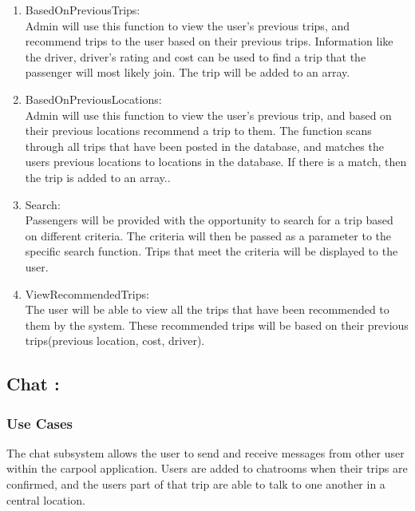 \documentclass[hidelinks, 12pt, a4paper]{article}
\begin{document}
\begin{enumerate}[label=U1.\arabic*]
                \item BasedOnPreviousTrips:\\
                Admin will use this function to view the user’s previous trips, and recommend trips to the user based on their previous trips. Information like the driver, driver’s rating and cost can be used to find a trip that the passenger will most likely join. The trip will be added to an array.\\
                	
                \item BasedOnPreviousLocations: \\
                Admin will use this function to view the user’s previous trip, and based on their previous locations recommend a trip to them. The function scans through all trips that have been posted in the database, and matches the users  previous locations to locations in the database. If there is a match, then the trip is added to an array..\\
                
                \item Search:\\
                Passengers will be provided with the opportunity to search for a trip based on different criteria. The criteria will then be passed as a parameter to the specific search function. Trips that meet the criteria will be displayed to the user.\\

                \item ViewRecommendedTrips:\\
                The user will be able to view all the trips that have been recommended to them by the system. These recommended trips will be based on their previous trips(previous location, cost, driver). \\
                	
            \end{enumerate}
\newpage
                \subsection{Chat :}
                \subsubsection{Use Cases}
                The chat subsystem allows the user to send and receive messages from other user within the carpool application. Users are added to chatrooms when their trips are confirmed, and the users part of that trip are able to talk to one another in a central location.
                    
\end{document}
